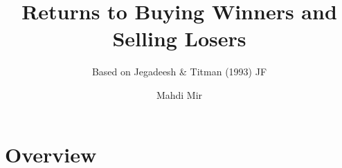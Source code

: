 \documentclass{beamer}
\title[]{Returns to Buying Winners and Selling Losers}
\subtitle{Based on Jegadeesh \& Titman (1993) JF }
\author[]{Mahdi Mir}
\begin{document}

\maketitle

\section{Overview}
\end{document}
